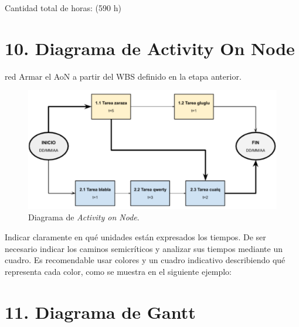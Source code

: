 \documentclass[
11pt, %
codirector, %
]{charter}
\begin{document}
Cantidad total de horas: (590 h)



\section{10. Diagrama de Activity On Node}
\label{sec:AoN}

\begin{consigna}{red}
Armar el AoN a partir del WBS definido en la etapa anterior. 



\end{consigna}

\begin{figure}[htpb]
\centering 
\includegraphics[width=.8\textwidth]{./Figuras/AoN.png}
\caption{Diagrama de \textit{Activity on Node}.}
\label{fig:AoN}
\end{figure}

Indicar claramente en qué unidades están expresados los tiempos.
De ser necesario indicar los caminos semicríticos y analizar sus tiempos mediante un cuadro.
Es recomendable usar colores y un cuadro indicativo describiendo qué representa cada color, como se muestra en el siguiente ejemplo:



\section{11. Diagrama de Gantt}
\label{sec:gantt}
\end{document}
